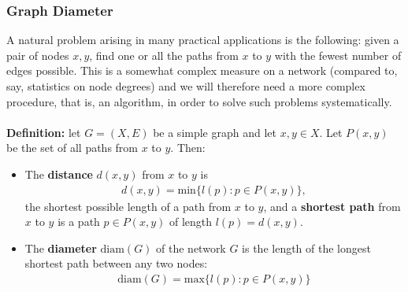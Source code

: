 \documentclass[a4paper,11pt]{article}
\begin{document}
\subsubsection{Graph Diameter}
A natural problem arising in many practical applications is the following: given a pair of nodes $x,y$, find one or all the paths from $x$ to $y$ with the fewest number of edges possible.
This is a somewhat complex measure on a network (compared to, say, statistics on node degrees) and we will therefore need a more complex procedure, that is, an algorithm, in order to solve such problems systematically.
\\\\
\textbf{Definition:} let $G=(X,E)$ be a simple graph and let $x,y \in X$.
Let $P(x,y)$ be the set of all paths from $x$ to $y$.
Then:
\begin{itemize}
    \item   The \textbf{distance} $d(x,y)$ from $x$ to $y$ is
            \begin{align*}
                d(x,y) = \text{min}\{ l(p) : p \in P(x,y) \},
            \end{align*}
            the shortest possible length of a path from $x$ to $y$, and a \textbf{shortest path} from $x$ to $y$ is a path $p \in P(x,y)$ of length $l(p) = d(x,y)$.

    \item   The \textbf{diameter} $\text{diam}(G)$ of the network $G$ is the length of the longest shortest path between any two nodes:
            \begin{align*}
                \text{diam}(G) = \text{max}\{ l(p) : p \in P(x,y) \}
            \end{align*}
\end{itemize}
\end{document}
